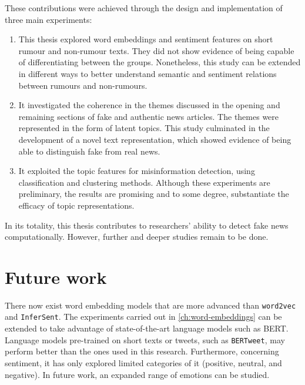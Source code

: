 These contributions were achieved through the design and implementation of three main experiments:

\begin{enumerate}
  \item This thesis explored word embeddings and sentiment features on short rumour and non-rumour texts. They did not show evidence of being capable of differentiating between the groups. Nonetheless, this study can be extended in different ways to better understand semantic and sentiment relations between rumours and non-rumours.

  \item It investigated the coherence in the themes discussed in the opening and remaining sections of fake and authentic news articles. The themes were represented in the form of latent topics. This study culminated in the development of a novel text representation, which showed evidence of being able to distinguish fake from real news.

  \item It exploited the topic features for misinformation detection, using classification and clustering methods. Although these experiments are preliminary, the results are promising and to some degree, substantiate the efficacy of topic representations.
\end{enumerate}

In its totality, this thesis contributes to researchers' ability to detect fake news computationally. However, further and deeper studies remain to be done.

\section{Future work}
\label{sec:6-future}

There now exist word embedding models that are more advanced than \texttt{word2vec} and \texttt{InferSent}. The experiments carried out in \autoref{ch:word-embeddings} can be extended to take advantage of state-of-the-art language models such as \ac{BERT}. Language models pre-trained on short texts or tweets, such as \texttt{BERTweet}, may perform better than the ones used in this research. Furthermore, concerning sentiment, it has only explored limited categories of it (positive, neutral, and negative). In future work, an expanded range of emotions can be studied.

